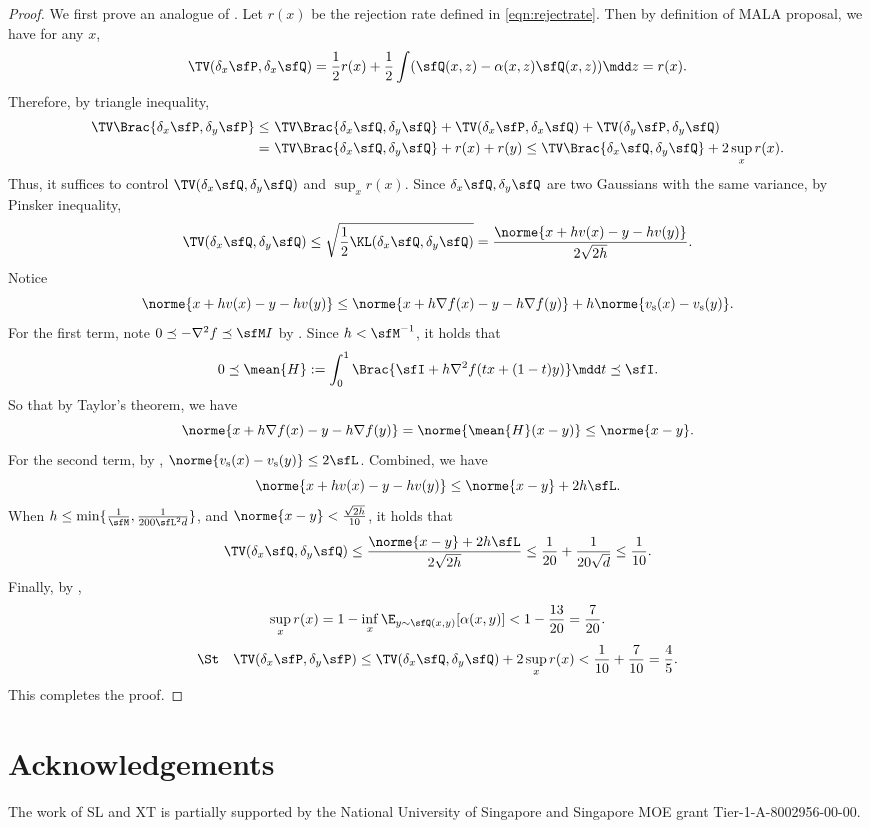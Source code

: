 \documentclass[11pt]{article}
\begin{document}
\begin{proof}
%
We first prove an analogue of .
Let $r(x)$ be the rejection rate defined in \eqref{eqn:rejectrate}.
Then by definition of MALA proposal, we have for any $x$,
\[
    \TV(\delta_x \sfP, \delta_x \sfQ) = \frac{1}{2} r(x) + \frac{1}{2} \int ( \sfQ(x,z) - \alpha(x,z) \sfQ(x,z) ) \mdd z = r(x). 
\]
Therefore, by triangle inequality,
\begin{align*}
    \TV \Brac{ \delta_x \sfP, \delta_y \sfP } \le~& \TV \Brac{ \delta_x \sfQ, \delta_y \sfQ } + \TV(\delta_x \sfP, \delta_x \sfQ) + \TV(\delta_y \sfP, \delta_y \sfQ) \\
    =~& \TV \Brac{ \delta_x \sfQ, \delta_y \sfQ } + r(x) + r(y) \le \TV \Brac{ \delta_x \sfQ, \delta_y \sfQ } + 2 \sup_x r(x).
\end{align*}
Thus, it suffices to control $\TV(\delta_x \sfQ,\delta_y \sfQ)$ and $\sup_x r(x)$. 
%
Since $\delta_x \sfQ,\delta_y \sfQ$ are two Gaussians with the same variance, by Pinsker inequality,
\[
    \TV (\delta_x \sfQ,\delta_y \sfQ) \le \sqrt{\frac{1}{2} \KL (\delta_x \sfQ,\delta_y \sfQ)} = \frac{\norme{x+hv(x)-y-hv(y)}}{2\sqrt{2h}}.
\]
Notice 
\[
    \norme{x+hv(x)-y-hv(y)} \le \norme{x+h\nabla f (x)-y-h\nabla f (y)} + h \norme{v_{\rm s}(x)-v_{\rm s}(y)}. 
\]
For the first term, note $0 \preceq - \nabla^2 f \preceq \sfM I$ by . Since $h < \sfM^{-1}$, it holds that
\[
    0 \preceq \mean{H} := \int_0^1 \Brac{ \sfI + h \nabla^2 f (tx+(1-t)y) } \mdd t \preceq  \sfI.
\]
So that by Taylor's theorem, we have
\[
    \norme{x+h\nabla f (x)-y-h\nabla f (y)} = \norme{\mean{H} (x-y)} \le \norme{x-y}. 
\]
For the second term, by , $\norme{v_{\rm s}(x)-v_{\rm s}(y)} \le 2 \sfL$.
Combined, we have
\[
    \norme{x+hv(x)-y-hv(y)} \le \norme{x-y} + 2 h \sfL. 
\]
When $h\le \min \{ \frac{1}{\sfM} , \frac{1}{200\sfL^2d} \}$, and $\norme{x-y} < \frac{\sqrt{2h}}{10}$, it holds that
\[
    \TV (\delta_x \sfQ,\delta_y \sfQ) \le \frac{\norme{x-y} + 2 h \sfL}{2\sqrt{2h}} \le \frac{1}{20} + \frac{1}{20\sqrt{d}} \le \frac{1}{10}.  
\]
Finally, by ,
\[
    \sup_x r(x) = 1 - \inf_x \E_{y \sim \sfQ(x,y)} [\alpha(x,y)] < 1 - \frac{13}{20} = \frac{7}{20}.
\]
\[
    \St\quad \TV(\delta_x \sfP,\delta_y \sfP) \le
    \TV(\delta_x \sfQ,\delta_y \sfQ) + 2 \sup_x r(x) < \frac{1}{10} + \frac{7}{10} = \frac{4}{5}.
\]
This completes the proof. 
\end{proof}




\section*{Acknowledgements}

The work of SL and XT is partially supported by the National University of Singapore and Singapore MOE grant Tier-1-A-8002956-00-00.




\end{document}
